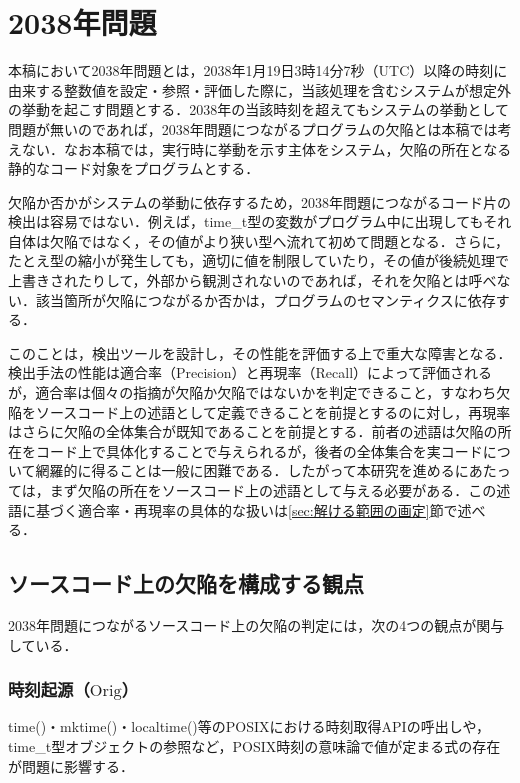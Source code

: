\documentclass[submit,techrep,noauthor]{ipsj}
\begin{document}
\section{2038年問題}

本稿において2038年問題とは，2038年1月19日3時14分7秒（UTC）以降の時刻に由来する整数値を設定・参照・評価した際に，当該処理を含むシステムが想定外の挙動を起こす問題とする．2038年の当該時刻を超えてもシステムの挙動として問題が無いのであれば，2038年問題につながるプログラムの欠陥とは本稿では考えない．なお本稿では，実行時に挙動を示す主体をシステム，欠陥の所在となる静的なコード対象をプログラムとする．

欠陥か否かがシステムの挙動に依存するため，2038年問題につながるコード片の検出は容易ではない．例えば，time\_t型の変数がプログラム中に出現してもそれ自体は欠陥ではなく，その値がより狭い型へ流れて初めて問題となる．さらに，たとえ型の縮小が発生しても，適切に値を制限していたり，その値が後続処理で上書きされたりして，外部から観測されないのであれば，それを欠陥とは呼べない．該当箇所が欠陥につながるか否かは，プログラムのセマンティクスに依存する．

このことは，検出ツールを設計し，その性能を評価する上で重大な障害となる．検出手法の性能は適合率（Precision）と再現率（Recall）によって評価されるが，適合率は個々の指摘が欠陥か欠陥ではないかを判定できること，すなわち欠陥をソースコード上の述語として定義できることを前提とするのに対し，再現率はさらに欠陥の全体集合が既知であることを前提とする．前者の述語は欠陥の所在をコード上で具体化することで与えられるが，後者の全体集合を実コードについて網羅的に得ることは一般に困難である．したがって本研究を進めるにあたっては，まず欠陥の所在をソースコード上の述語として与える必要がある．この述語に基づく適合率・再現率の具体的な扱いは\ref{sec:解ける範囲の画定}節で述べる．

\subsection{ソースコード上の欠陥を構成する観点}

2038年問題につながるソースコード上の欠陥の判定には，次の4つの観点が関与している．

\subsubsection{時刻起源（$\mathrm{Orig}$）}

time()・mktime()・localtime()等のPOSIX\cite{ref1}における時刻取得APIの呼出しや，time\_t型オブジェクトの参照など，POSIX時刻の意味論で値が定まる式の存在が問題に影響する．
\end{document}
